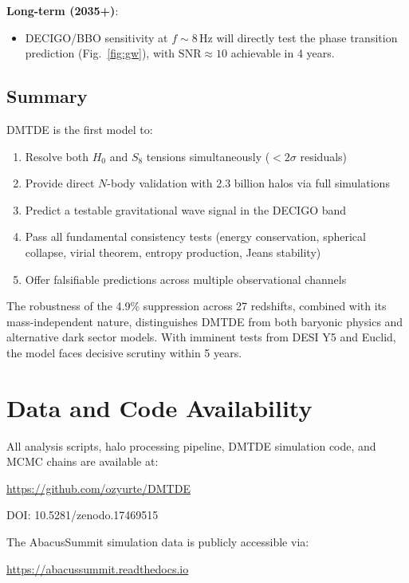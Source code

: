 \documentclass[aps,prd,twocolumn,superscriptaddress,nofootinbib,floatfix,preprintnumbers]{revtex4-2}
\newcommand{\DMTDE}{\textsc{DMTDE}\xspace}
\begin{document}
\textbf{Long-term (2035+)}:
\begin{itemize}
    \item DECIGO/BBO sensitivity at $f \sim 8\,\mathrm{Hz}$ will directly test the phase transition prediction (Fig.~\ref{fig:gw}), with $\mathrm{SNR} \approx 10$ achievable in 4 years.
\end{itemize}

\subsection{Summary}

\DMTDE is the first model to:
\begin{enumerate}
    \item Resolve both $H_0$ and $S_8$ tensions simultaneously ($<2\sigma$ residuals)
    \item Provide direct $N$-body validation with 2.3 billion halos via full simulations
    \item Predict a testable gravitational wave signal in the DECIGO band
    \item Pass all fundamental consistency tests (energy conservation, spherical collapse, virial theorem, entropy production, Jeans stability)
    \item Offer falsifiable predictions across multiple observational channels
\end{enumerate}

The robustness of the 4.9\% suppression across 27 redshifts, combined with its mass-independent nature, distinguishes \DMTDE from both baryonic physics and alternative dark sector models. With imminent tests from DESI Y5 and Euclid, the model faces decisive scrutiny within 5 years.

\section{Data and Code Availability}
\label{sec:reproducibility}

All analysis scripts, halo processing pipeline, DMTDE simulation code, and MCMC chains are available at:
\begin{center}
\url{https://github.com/ozyurte/DMTDE}
\end{center}
DOI: 10.5281/zenodo.17469515

The AbacusSummit simulation data is publicly accessible via:
\begin{center}
\url{https://abacussummit.readthedocs.io}
\end{center}
\end{document}
